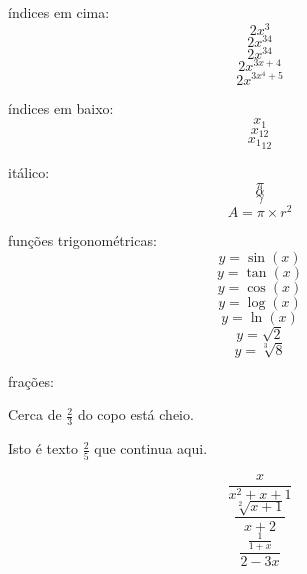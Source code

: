 \documentclass[11pt]{article}
\begin{document}
índices em cima:
$$2x^3$$
$$2x^{34}$$
$$2x^34$$
$$2x^{3x+4}$$
$$2x^{3x^4+5}$$

índices em baixo:
$$x_1$$
$$x_{12}$$
$${x_1}_{12}$$

itálico:
$$\pi$$
$$\alpha$$
$$\gamma$$
$$A=\pi \times r^2$$

funções trigonométricas:
$$y=\sin (x)$$
$$y=\tan (x)$$
$$y=\cos (x)$$
$$y=\log (x)$$
$$y=\ln (x)$$
$$y=\sqrt{2}$$
$$y=\sqrt[3]{8}$$

frações:

Cerca de $\frac{2}{3}$ do copo está cheio.

Isto é texto $\displaystyle{\frac{2}{5}}$ que continua aqui.

$$\frac{x}{x^2+x+1}$$
$$\frac{\sqrt[2]{x+1}}{x+2}$$
$$\frac{\frac{1}{1+x}}{2-3x}$$
\end{document}

